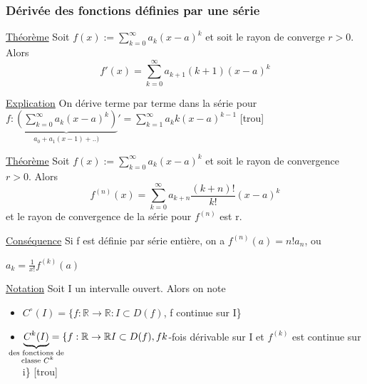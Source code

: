 \documentclass[12pt,a4paper]{article}
\newcommand{\somme}[2]{\ensuremath{\sum\limits_{#2}^{#1}}}
\newcommand{\R}{\ensuremath{\mathbb{R}} }
\newcommand{\rtor}{\ensuremath{\R \to \R} }
\newcommand{\Theoreme}{\underline{Théorème} }
\begin{document}
{\subsubsection{Dérivée des fonctions définies par une série}
\begin{boite}
	\Theoreme Soit $f(x):= \somme{\infty}{k=0}{a_k(x-a)^k}$ et soit le rayon de converge $r > 0$. Alors
	\begin{equation}
		f'(x) = \somme{\infty}{k=0}{a_{k+1}(k+1)(x-a)^k}
	\end{equation}
\end{boite}
\underline{Explication} On dérive terme par terme dans la série pour \\
$f: \underbrace{\left(\somme{\infty}{k=0}{a_k(x-a)^k}\right)}_{a_0+a_1(x-1)+..)}' = \somme{\infty}{k=1}{a_kk(x-a)^{k-1}}$
[trou]
\begin{boite}
	\Theoreme Soit $f(x):= \somme{\infty}{k=0}{a_k(x-a)^k}$ et soit le rayon de convergence $r > 0$. Alors 
	\begin{equation}
		f^{(n)}(x) = \somme{\infty}{k=0}{a_{k+n}\frac{(k+n)!}{k!}(x-a)^k}
	\end{equation}
	et le rayon de convergence de la série pour $f^{(n)}$ est r.
\end{boite}
\begin{boite}
\underline{Conséquence} Si f est définie par série entière, on a $f^{(n)}(a) = n!a_n$, ou 
\begin{boite}[0.25]
	$a_k = \frac{1}{x!}f^{(k)}(a)$
\end{boite}
\end{boite}
\underline{Notation} Soit I un intervalle ouvert. Alors on note 
\begin{itemize}
	\item $C^{\circ}(I) = \{f:\rtor : I \subset D(f)$, f continue sur I\}
	\item $\underbrace{C^k(I)}_{\mathclap{\substack{\text{des fonctions de} \\ \text{ classe } C^k}}} = \{f:\rtor I\subset D(f), f k$-fois dérivable sur I et $f^{(k)}$ est continue sur i\}
	[trou]
\end{itemize}
}
\end{document}
